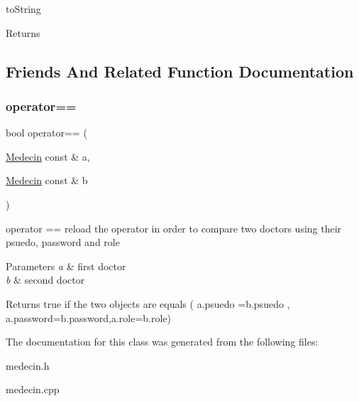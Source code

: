 to\+String 

\begin{DoxyReturn}{Returns}

\end{DoxyReturn}


\subsection{Friends And Related Function Documentation}
\mbox{\label{class_medecin_ab809729def57ace90c0e2cd31232d18c}} 
\subsubsection{\texorpdfstring{operator==}{operator==}}
{\footnotesize\ttfamily bool operator== (\begin{DoxyParamCaption}\item[{\mbox{\hyperlink{class_medecin}{Medecin}} const \&}]{a,  }\item[{\mbox{\hyperlink{class_medecin}{Medecin}} const \&}]{b }\end{DoxyParamCaption})\hspace{0.3cm}{\ttfamily [friend]}}



operator == reload the operator in order to compare two doctors using their psuedo, password and role 


\begin{DoxyParams}{Parameters}
{\em a} & first doctor \\
\hline
{\em b} & second doctor \\
\hline
\end{DoxyParams}
\begin{DoxyReturn}{Returns}
true if the two objects are equals ( a.\+psuedo =b.\+psuedo , a.\+password=b.\+password,a.\+role=b.\+role) 
\end{DoxyReturn}


The documentation for this class was generated from the following files\+:\begin{DoxyCompactItemize}
\item 
medecin.\+h\item 
medecin.\+cpp\end{DoxyCompactItemize}

